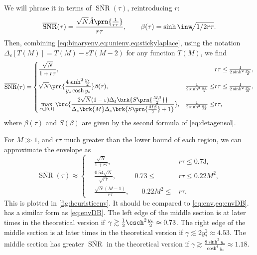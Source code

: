 \documentclass[12pt]{article}
\DeclareMathOperator{\snr}{SNR}
\newcommand{\snrb}{\overline{\snr}}
\begin{document}
We will phrase it in terms of \(\snrb(\tau)\), reintroducing \(r\):
%
\begin{equation}\label{eq:envunits}
  \snrb(\tau) = \frac{ \sqrt{N} \hat{A}\prn{\frac{1}{r\tau}} }{ r\tau },
  \qquad
  \beta(\tau) = \sinh\inv \!\!\sqrt{1/2r\tau}.
\end{equation}
%
Then, combining \cref{eq:binaryenv,eq:unienv,eq:stickylaplace}, using the notation \( \Delta_{\varepsilon}[T(M)] = T(M) - \varepsilon T(M-2) \) for any function \(T(M)\), we find
%
\begin{equation}\label{eq:henv}
  \snrb(\tau) = \left\{
\begin{aligned}
  & \frac{\sqrt{N}}{1+r\tau}, &
  & r\tau \leq \tfrac{1}{2\sinh^2\frac{y_*}{2}} , \\
  & \sqrt{N}\prn{ \frac{ 4\sinh^2 \frac{y_*}{2} }{ y_* \cosh y_* } } \beta(\tau), &
  \tfrac{1}{2\sinh^2 \frac{y_*}{2}} \leq & r\tau \leq \tfrac{1}{2\sinh^2 \frac{y_*}{M}} , \\
  & \max_{\varepsilon \in [0,1]} \brc{
      \frac{2\sqrt{N}(1-\varepsilon) \Delta_{\varepsilon}\brk{S\prn{\tfrac{M\beta}{2}}}}
      {\Delta_{\varepsilon}\brk{M} \Delta_{\varepsilon}\brk{S\prn{\tfrac{M\beta}{2}} + 1} } 
      }, &
  \tfrac{1}{2\sinh^2 \frac{y_*}{M}} \leq & r\tau ,
\end{aligned}
\right.
\end{equation}
%
where \(\beta(\tau)\) and \(S(\beta)\) are given by the second formula of \cref{eq:detagensol}.

For \(M \gg 1\), and \(r\tau\) much greater than the lower bound of each region, we can approximate the envelope as
%
\begin{equation}\label{eq:henvapprox}
  \snrb(\tau) \approx \left\{
\begin{aligned}
  & \frac{\sqrt{N}}{1+r\tau}, &
  & r\tau \leq 0.73 , \\
  & \frac{ 0.54\sqrt{N}}{ \sqrt{r\tau} } , &
  0.73 \leq & r\tau \leq 0.22 M^2 , \\
  & \frac{ \sqrt{N} (M-1) }{ r\tau }, &\quad
  0.22 M^2 \leq &r\tau .
\end{aligned}
\right.
\end{equation}
%
This is plotted in \cref{fig:heuristicenv}.
It should be compared to \cref{eq:env,eq:envDB}.
 has a similar form as \cref{eq:envDB}.
The left edge of the middle section is at later times in the theoretical version if \(\gamma \gtrsim \frac{1}{2} \csch^2 \frac{y_\ast}{2} \approx 0.73 \).
The right edge of the middle section is at later times in the theoretical version if \(\gamma \lesssim 2 y_\ast^2 \approx 4.53 \).
The middle section has greater \(\snrb\) in the theoretical version if \(\gamma \gtrsim \frac{8\sinh^2y_\ast}{\cosh^4y_\ast} \approx 1.18 \).
\end{document}
